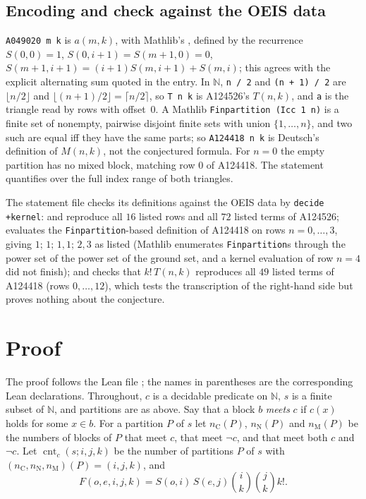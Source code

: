 \documentclass[11pt]{amsart}
\theoremstyle{plain}
\theoremstyle{definition}
\newcommand{\N}{\mathbb{N}}
\newcommand{\nC}{n_{\mathrm C}}
\newcommand{\nN}{n_{\mathrm N}}
\newcommand{\nM}{n_{\mathrm M}}
\newcommand{\cnt}{\operatorname{cnt}}
\begin{document}
\subsection*{Encoding and check against the OEIS data}
\texttt{A049020 m k} is $a(m,k)$, with Mathlib's , defined by the recurrence $S(0,0)=1$, $S(0,i+1)=S(m+1,0)=0$, $S(m+1,i+1)=(i+1)S(m,i+1)+S(m,i)$; this agrees with the explicit alternating sum quoted in the entry.
In $\N$, \texttt{n / 2} and \texttt{(n + 1) / 2} are $\lfloor n/2\rfloor$ and $\lfloor(n+1)/2\rfloor=\lceil n/2\rceil$, so \texttt{T n k} is A124526's $T(n,k)$, and \texttt{a} is the triangle read by rows with offset~$0$.
A Mathlib \texttt{Finpartition (Icc 1 n)} is a finite set of nonempty, pairwise disjoint finite sets with union $\{1,\dots,n\}$, and two such are equal iff they have the same parts; so \texttt{A124418 n k} is Deutsch's definition of $M(n,k)$, not the conjectured formula.
For $n=0$ the empty partition has no mixed block, matching row $0$ of A124418. The statement quantifies over the full index range of both triangles.

The statement file checks its definitions against the OEIS data by \texttt{decide +kernel}:  and  reproduce all $16$ listed rows and all $72$ listed terms of A124526;  evaluates the \texttt{Finpartition}-based definition of A124418 on rows $n=0,\dots,3$, giving $1;\,1;\,1,1;\,2,3$ as listed (Mathlib enumerates \texttt{Finpartition}s through the power set of the power set of the ground set, and a kernel evaluation of row $n=4$ did not finish); and  checks that $k!\,T(n,k)$ reproduces all $49$ listed terms of A124418 (rows $0,\dots,12$), which tests the transcription of the right-hand side but proves nothing about the conjecture.

\section{Proof}\label{sec:proof}

The proof follows the Lean file ; the names in parentheses are the corresponding Lean declarations.
Throughout, $c$ is a decidable predicate on $\N$, $s$ is a finite subset of $\N$, and partitions are as above.
Say that a block $b$ \emph{meets} $c$ if $c(x)$ holds for some $x\in b$.
For a partition $P$ of $s$ let $\nC(P)$, $\nN(P)$ and $\nM(P)$ be the numbers of blocks of $P$ that meet $c$, that meet $\neg c$, and that meet both $c$ and $\neg c$.
Let $\cnt_c(s;i,j,k)$ be the number of partitions $P$ of $s$ with $(\nC,\nN,\nM)(P)=(i,j,k)$, and
\[
  F(o,e,i,j,k)=S(o,i)\,S(e,j)\binom ik\binom jk k! .
\]
\end{document}
